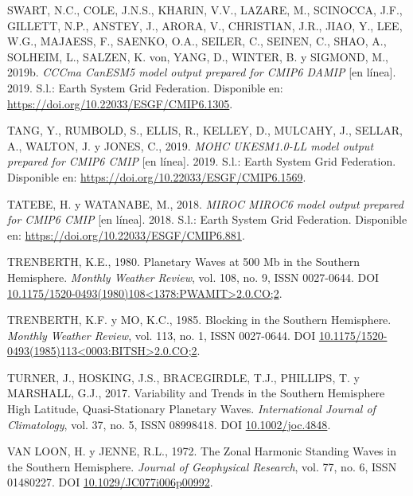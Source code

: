 \documentclass[12pt,oneside,a4paper]{reedthesis}
\newlength{\cslhangindent}
\newenvironment{CSLReferences}[2] %
 {%
  \setlength{\parindent}{0pt}
  \ifodd #1 \everypar{\setlength{\hangindent}{\cslhangindent}}\ignorespaces\fi
  \ifnum #2 > 0
  \setlength{\parskip}{#2\baselineskip}
  \fi
 }%
 {}
\begin{document}
\begin{CSLReferences}{1}{0}
\leavevmode{}%
SWART, N.C., COLE, J.N.S., KHARIN, V.V., LAZARE, M., SCINOCCA, J.F., GILLETT, N.P., ANSTEY, J., ARORA, V., CHRISTIAN, J.R., JIAO, Y., LEE, W.G., MAJAESS, F., SAENKO, O.A., SEILER, C., SEINEN, C., SHAO, A., SOLHEIM, L., SALZEN, K. von, YANG, D., WINTER, B. y SIGMOND, M., 2019b. \emph{CCCma CanESM5 model output prepared for CMIP6 DAMIP} {[}en línea{]}. 2019. S.l.: Earth System Grid Federation. Disponible en: \url{https://doi.org/10.22033/ESGF/CMIP6.1305}.

\leavevmode{}%
TANG, Y., RUMBOLD, S., ELLIS, R., KELLEY, D., MULCAHY, J., SELLAR, A., WALTON, J. y JONES, C., 2019. \emph{MOHC UKESM1.0-LL model output prepared for CMIP6 CMIP} {[}en línea{]}. 2019. S.l.: Earth System Grid Federation. Disponible en: \url{https://doi.org/10.22033/ESGF/CMIP6.1569}.

\leavevmode{}%
TATEBE, H. y WATANABE, M., 2018. \emph{MIROC MIROC6 model output prepared for CMIP6 CMIP} {[}en línea{]}. 2018. S.l.: Earth System Grid Federation. Disponible en: \url{https://doi.org/10.22033/ESGF/CMIP6.881}.

\leavevmode{}%
TRENBERTH, K.E., 1980. Planetary {Waves} at 500 Mb in the {Southern Hemisphere}. \emph{Monthly Weather Review}, vol. 108, no. 9, ISSN 0027-0644. DOI \href{https://doi.org/10.1175/1520-0493(1980)108\%3C1378:PWAMIT\%3E2.0.CO;2}{10.1175/1520-0493(1980)108\textless1378:PWAMIT\textgreater2.0.CO;2}.

\leavevmode{}%
TRENBERTH, K.F. y MO, K.C., 1985. Blocking in the {Southern Hemisphere}. \emph{Monthly Weather Review}, vol. 113, no. 1, ISSN 0027-0644. DOI \href{https://doi.org/10.1175/1520-0493(1985)113\%3C0003:BITSH\%3E2.0.CO;2}{10.1175/1520-0493(1985)113\textless0003:BITSH\textgreater2.0.CO;2}.

\leavevmode{}%
TURNER, J., HOSKING, J.S., BRACEGIRDLE, T.J., PHILLIPS, T. y MARSHALL, G.J., 2017. Variability and Trends in the {Southern Hemisphere} High Latitude, Quasi-Stationary Planetary Waves. \emph{International Journal of Climatology}, vol. 37, no. 5, ISSN 08998418. DOI \href{https://doi.org/10.1002/joc.4848}{10.1002/joc.4848}.

\leavevmode{}%
VAN LOON, H. y JENNE, R.L., 1972. The Zonal Harmonic Standing Waves in the Southern Hemisphere. \emph{Journal of Geophysical Research}, vol. 77, no. 6, ISSN 01480227. DOI \href{https://doi.org/10.1029/JC077i006p00992}{10.1029/JC077i006p00992}.


\end{CSLReferences}
\end{document}
